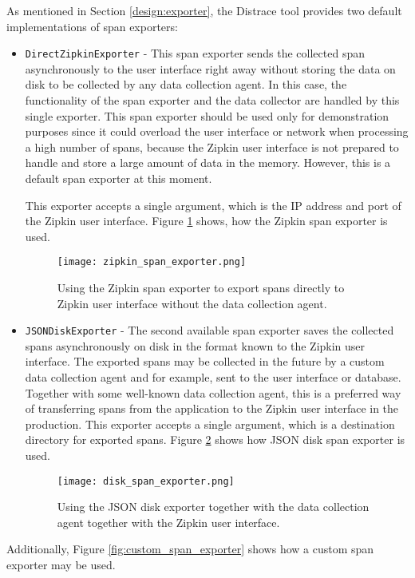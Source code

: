 As mentioned in Section \ref{design:exporter}, the Distrace tool provides two default implementations of span exporters:
\begin{itemize}
	\item  \texttt{DirectZipkinExporter} -  This span exporter sends the collected span asynchronously to the user interface right away without storing the data on disk to be collected by any data collection agent. In this case, the functionality of the span exporter and the data collector are handled by this single exporter.
	This span exporter should be used only for demonstration purposes since it could overload the user interface or network when processing a high number of spans, because the Zipkin user interface is not prepared to handle and store a large amount of data in the memory. However, this is a default span exporter at this moment.
	
	This exporter accepts a single argument, which is the IP address and port of the Zipkin user interface. Figure \ref{fig:zipkin_span_exporter} shows, how the Zipkin span exporter is used.
	
	\begin{figure}
		\centering
		\texttt{[image: zipkin\_span\_exporter.png]}
		\caption{Using the Zipkin span exporter to export spans directly to Zipkin user interface without the data collection agent.}
		\label{fig:zipkin_span_exporter}
	\end{figure}
	\item  \texttt{JSONDiskExporter} - The second available span exporter saves the collected spans asynchronously on disk in the format known to the Zipkin user interface. The exported spans may be collected in the future by a custom data collection agent and for example, sent to the user interface or database. Together with some well-known data collection agent, this is a preferred way of transferring spans from the application to the Zipkin user interface in the production. This exporter accepts a single argument, which is a destination directory for exported spans. Figure \ref{fig:disk_span_exporter} shows how JSON disk span exporter is used.
	\begin{figure}
		\centering
		\texttt{[image: disk\_span\_exporter.png]}
		\caption{Using the JSON disk exporter together with the data collection agent together with the Zipkin user interface.}
		\label{fig:disk_span_exporter}
	\end{figure}
\end{itemize}
Additionally, Figure \ref{fig:custom_span_exporter} shows how a custom span exporter may be used.

